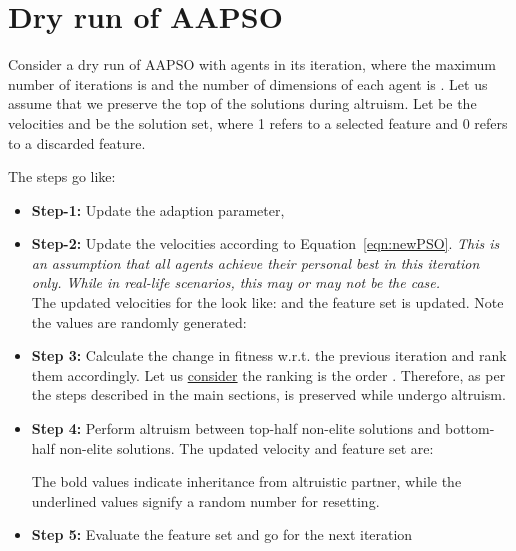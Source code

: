 \documentclass[final,3p,times]{elsarticle}
\begin{document}
\appendix
\section{Dry run of AAPSO}
\label{ap:PSO}
Consider a dry run of AAPSO with  agents in its  iteration, where the maximum number of iterations is  and the number of dimensions of each agent is . Let us assume that we preserve the top  of the solutions during altruism. Let  be the velocities and  be the solution set, where 1 refers to a selected feature and 0 refers to a discarded feature.


The steps go like:
\begin{itemize}
    \item \textbf{Step-1: }Update the adaption parameter, 
    \item \textbf{Step-2: }Update the velocities according to Equation~\ref{eqn:newPSO}. \emph{This is an assumption that all agents achieve their personal best in this iteration only. While in real-life scenarios, this may or may not be the case.}\\
    The updated velocities for the  look like:  and the feature set is updated. Note the values  are randomly generated:
    
  
    \item \textbf{Step 3: }Calculate the change in fitness w.r.t. the previous iteration and rank them accordingly. Let us \underline{consider} the ranking is the order . Therefore, as per the steps described in the main sections,  is preserved while  undergo altruism.
    \item \textbf{Step 4:} Perform altruism between top-half non-elite solutions and bottom-half non-elite solutions. The updated velocity and feature set are:
    

The bold values indicate inheritance from altruistic partner, while the underlined values signify a random number for resetting.
\item \textbf{Step 5: }Evaluate the feature set and go for the next iteration
\end{itemize}
\end{document}
